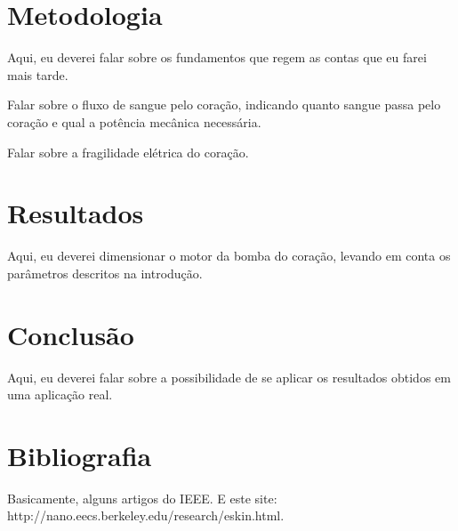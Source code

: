 \documentclass[12pt, a4paper, twoside]{article}
\begin{document}
\section{Metodologia}

Aqui, eu deverei falar sobre os fundamentos que regem as contas que eu farei mais tarde.

Falar sobre o fluxo de sangue pelo coração, indicando quanto sangue passa pelo coração e qual a potência mecânica necessária.

Falar sobre a fragilidade elétrica do coração.

\section{Resultados}

Aqui, eu deverei dimensionar o motor da bomba do coração, levando em conta os parâmetros descritos na introdução.

\section{Conclusão}

Aqui, eu deverei falar sobre a possibilidade de se aplicar os resultados obtidos em uma aplicação real.

\section{Bibliografia}

Basicamente, alguns artigos do IEEE. E este site: http://nano.eecs.berkeley.edu/research/eskin.html.
\end{document}
